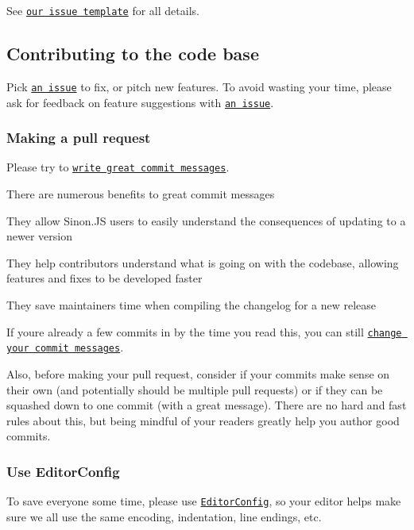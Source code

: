 See \href{https://github.com/sinonjs/sinon/blob/master/.github/}{\tt our issue template} for all details.

\subsection*{Contributing to the code base}

Pick \href{https://github.com/sinonjs/sinon/issues}{\tt an issue} to fix, or pitch new features. To avoid wasting your time, please ask for feedback on feature suggestions with \href{https://github.com/sinonjs/sinon/issues/new}{\tt an issue}.

\subsubsection*{Making a pull request}

Please try to \href{http://chris.beams.io/posts/git-commit/}{\tt write great commit messages}.

There are numerous benefits to great commit messages


\begin{DoxyItemize}
\item They allow Sinon.\+JS users to easily understand the consequences of updating to a newer version
\item They help contributors understand what is going on with the codebase, allowing features and fixes to be developed faster
\item They save maintainers time when compiling the changelog for a new release
\end{DoxyItemize}

If you\textquotesingle{}re already a few commits in by the time you read this, you can still \href{https://help.github.com/articles/changing-a-commit-message/}{\tt change your commit messages}.

Also, before making your pull request, consider if your commits make sense on their own (and potentially should be multiple pull requests) or if they can be squashed down to one commit (with a great message). There are no hard and fast rules about this, but being mindful of your readers greatly help you author good commits.

\subsubsection*{Use Editor\+Config}

To save everyone some time, please use \href{http://editorconfig.org}{\tt Editor\+Config}, so your editor helps make sure we all use the same encoding, indentation, line endings, etc.

